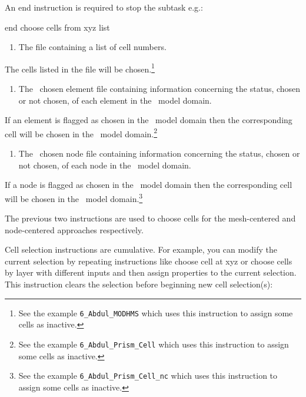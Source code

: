 {{    An end instruction is required to stop the subtask e.g.:

    {\Large \sf end choose cells from xyz list}
    }

    {
        \squish
        \begin{enumerate}
        \item {}  The file  containing a list of cell numbers.
        \end{enumerate}
        The cells listed in the file  will be chosen.\footnote{ See the example \texttt{6\_Abdul\_MODHMS} which uses this instruction to assign some cells as inactive.}
    }

    {
        \squish
        \begin{enumerate}
        \item {}  The \gb\ chosen element file  containing information concerning the status, chosen or not chosen, of each element in the \gb\ model domain.
        \end{enumerate}
          If an element is flagged as chosen in the \gb\ model domain then the corresponding cell will be chosen in the \mfus\ model domain.\footnote{ See the  example \texttt{6\_Abdul\_Prism\_Cell} which uses this instruction to assign some cells as inactive.}
    }

    {
        \squish
        \begin{enumerate}
        \item {}  The \gb\ chosen node file  containing information concerning the status, chosen or not chosen, of each node in the \gb\ model domain.
        \end{enumerate}
          If a node is flagged as chosen in the \gb\ model domain then the corresponding cell will be chosen in the \mfus\ model domain.\footnote{ See the  example \texttt{6\_Abdul\_Prism\_Cell\_nc} which uses this instruction to assign some cells as inactive.}
    }

The previous two instructions are used to choose cells for the mesh-centered and node-centered approaches respectively.

Cell selection instructions are cumulative.  For example, you can modify the current selection by repeating instructions like  \textsf{choose cell at xyz} or \textsf{choose cells by layer} with different inputs and then assign properties to the current selection.  This instruction clears the selection before beginning new cell selection(s):

}
